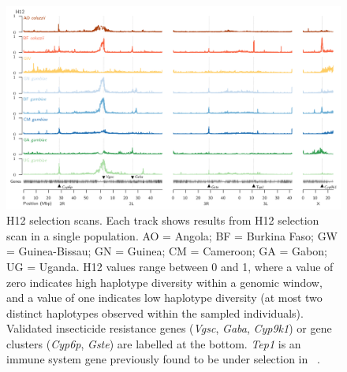 \documentclass[a4paper,11pt,abstracton,hidelinks]{scrartcl}
\begin{document}
\begin{figure}[t!]
\centering
\includegraphics[width=1.1\textwidth,center]{artwork/chapter5/h12.png}
\caption{H12 selection scans.
%
Each track shows results from H12 selection scan in a single population.
%
AO = Angola; BF = Burkina Faso; GW = Guinea-Bissau; GN = Guinea; CM = Cameroon; GA = Gabon; UG = Uganda.
%
H12 values range between 0 and 1, where a value of zero indicates high haplotype diversity within a genomic window, and a value of one indicates low haplotype diversity (at most two distinct haplotypes observed within the sampled individuals).
%
Validated insecticide resistance genes (\textit{Vgsc}, \textit{Gaba}, \textit{Cyp9k1}) or gene clusters (\textit{Cyp6p}, \textit{Gste}) are labelled at the bottom.
%
\textit{Tep1} is an immune system gene previously found to be under selection in \acol~\parencite{White2011}.
}
\label{fig:h12}
\end{figure}
\end{document}
